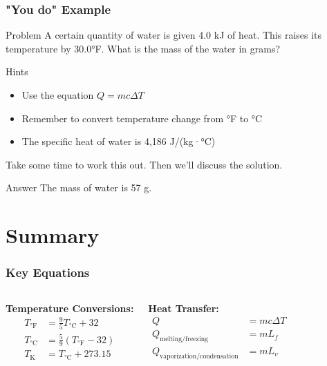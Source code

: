 \documentclass{beamer}
\begin{document}
\begin{frame}
    \frametitle{"You do" Example}
    \begin{block}{Problem}
        A certain quantity of water is given 4.0 kJ of heat. This raises its temperature by 30.0°F. What is the mass of the water in grams?
    \end{block}
    
    \begin{alertblock}{Hints}
        \begin{itemize}
            \item Use the equation $Q = mc\Delta T$
            \item Remember to convert temperature change from °F to °C
            \item The specific heat of water is 4,186 J/(kg·°C)
        \end{itemize}
    \end{alertblock}
    
    Take some time to work this out. Then we'll discuss the solution.
    
    \pause
    
    \begin{exampleblock}{Answer}
        The mass of water is 57 g.
    \end{exampleblock}
\end{frame}

\section{Summary}

\begin{frame}
    \frametitle{Key Equations}
    \begin{columns}
        \textbf{Temperature Conversions:}
        \begin{align*}
            T_{\text{°F}} &= \frac{9}{5}T_{\text{°C}} + 32 \\
            T_{\text{°C}} &= \frac{5}{9}(T_{\text{°F}} - 32) \\
            T_{\text{K}} &= T_{\text{°C}} + 273.15
        \end{align*}
        
        \textbf{Heat Transfer:}
        \begin{align*}
            Q &= mc\Delta T \\
            Q_{\text{melting/freezing}} &= mL_f \\
            Q_{\text{vaporization/condensation}} &= mL_v
        \end{align*}
    \end{columns}
\end{frame}
\end{document}
